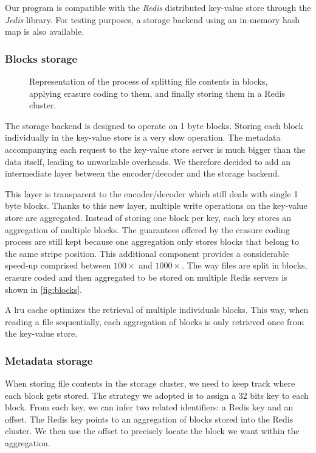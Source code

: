 Our program is compatible with the \textit{Redis} distributed key-value store through the \textit{Jedis} library.
For testing purposes, a storage backend using an in-memory hash map is also available.

\subsubsection{Blocks storage}

\begin{figure}[H]
    \centering
    
    \caption{Representation of the process of splitting file contents in blocks, applying erasure coding to them, and finally storing them in a Redis cluster.}
    \label{fig:blocks}
\end{figure}

The storage backend is designed to operate on 1 byte blocks.
Storing each block individually in the key-value store is a very slow operation.
The metadata accompanying each request to the key-value store server is much bigger than the data itself, leading to unworkable overheads.
We therefore decided to add an intermediate layer between the encoder/decoder and the storage backend.

This layer is transparent to the encoder/decoder which still deals with single 1 byte blocks.
Thanks to this new layer, multiple write operations on the key-value store are aggregated.
Instead of storing one block per key, each key stores an aggregation of multiple blocks.
The guarantees offered by the erasure coding process are still kept because one aggregation only stores blocks that belong to the same stripe position.
This additional component provides a considerable speed-up comprised between $100\times$ and $1000\times$.
The way files are split in blocks, erasure coded and then aggregated to be stored on multiple Redis servers is shown in \autoref{fig:blocks}.

A \ac{lru} cache optimizes the retrieval of multiple individuals blocks.
This way, when reading a file sequentially, each aggregation of blocks is only retrieved once from the key-value store.

\subsubsection{Metadata storage}

When storing file contents in the storage cluster, we need to keep track where each block gets stored.
The strategy we adopted is to assign a 32 bits key to each block.
From each key, we can infer two related identifiers: a Redis key and an offset.
The Redis key points to an aggregation of blocks stored into the Redis cluster.
We then use the offset to precisely locate the block we want within the aggregation.

